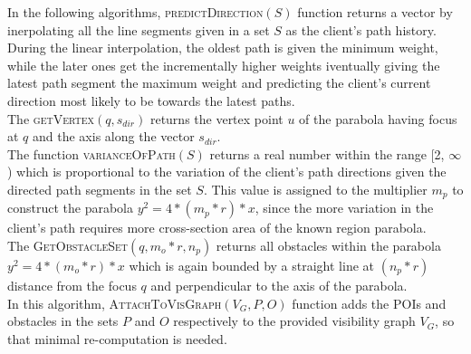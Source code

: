 In the following algorithms, \textsc{predictDirection}$(S)$ function returns a vector by inerpolating all the line segments given in a set $S$ as the client's path history. During the linear interpolation, the oldest path is given the minimum weight, while the later ones get the incrementally higher weights iventually giving the latest path segment the maximum weight and predicting the client's current direction most likely to be towards the latest paths.\\

The \textsc{getVertex}$(q, s_{dir})$ returns the vertex point $u$ of the parabola having focus at $q$ and the axis along the vector $s_{dir}$.\\

The function \textsc{varianceOfPath}$(S)$ returns a real number within the range [2, $\infty$) which is proportional to the variation of the client's path directions given the directed path segments in the set $S$. This value is assigned to the multiplier $m_p$ to construct the parabola $y^2 = 4*(m_p*r)*x$, since the more variation in the client's path requires more cross-section area of the known region parabola.\\

The \textsc{GetObstacleSet}$(q, m_o * r, n_p)$ returns all obstacles within the parabola $y^2 = 4*(m_o*r)*x$ which is again bounded by a straight line at $(n_p*r)$ distance from the focus $q$ and perpendicular to the axis of the parabola.\\


In this algorithm, \textsc{AttachToVisGraph}$(V_G, P, O)$ function adds the POIs and obstacles in the sets $P$ and $O$ respectively to the provided visibility graph $V_G$, so that minimal re-computation is needed.\\

